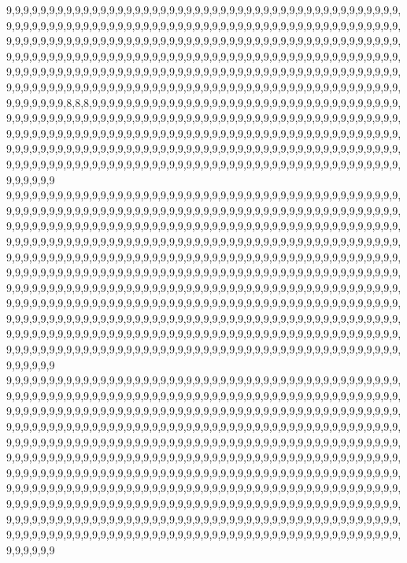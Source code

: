 9,9,9,9,9,9,9,9,9,9,9,9,9,9,9,9,9,9,9,9,9,9,9,9,9,9,9,9,9,9,9,9,9,9,9,9,9,9,9,9,9,9,9,9,9,9,9,9,9,9,9,9,9,9,9,9,9,9,9,9,9,9,9,9,9,9,9,9,9,9,9,9,9,9,9,9,9,9,9,9,9,9,9,9,9,9,9,9,9,9,9,9,9,9,9,9,9,9,9,9,9,9,9,9,9,9,9,9,9,9,9,9,9,9,9,9,9,9,9,9,9,9,9,9,9,9,9,9,9,9,9,9,9,9,9,9,9,9,9,9,9,9,9,9,9,9,9,9,9,9,9,9,9,9,9,9,9,9,9,9,9,9,9,9,9,9,9,9,9,9,9,9,9,9,9,9,9,9,9,9,9,9,9,9,9,9,9,9,9,9,9,9,9,9,9,9,9,9,9,9,9,9,9,9,9,9,9,9,9,9,9,9,9,9,9,9,9,9,9,9,9,9,9,9,9,9,9,9,9,9,9,9,9,9,9,9,9,9,9,9,9,9,9,9,9,9,9,9,9,9,9,9,9,9,9,9,9,9,9,9,9,9,9,9,9,9,9,9,9,9,9,9,9,9,9,9,9,9,9,9,9,9,9,8,8,8,9,9,9,9,9,9,9,9,9,9,9,9,9,9,9,9,9,9,9,9,9,9,9,9,9,9,9,9,9,9,9,9,9,9,9,9,9,9,9,9,9,9,9,9,9,9,9,9,9,9,9,9,9,9,9,9,9,9,9,9,9,9,9,9,9,9,9,9,9,9,9,9,9,9,9,9,9,9,9,9,9,9,9,9,9,9,9,9,9,9,9,9,9,9,9,9,9,9,9,9,9,9,9,9,9,9,9,9,9,9,9,9,9,9,9,9,9,9,9,9,9,9,9,9,9,9,9,9,9,9,9,9,9,9,9,9,9,9,9,9,9,9,9,9,9,9,9,9,9,9,9,9,9,9,9,9,9,9,9,9,9,9,9,9,9,9,9,9,9,9,9,9,9,9,9,9,9,9,9,9,9,9,9,9,9,9,9,9,9,9,9,9,9,9,9,9,9,9,9,9,9,9,9,9,9,9,9,9,9,9,9,9,9,9,9,9,9,9,9,9,9,9,9,9,9,9
9,9,9,9,9,9,9,9,9,9,9,9,9,9,9,9,9,9,9,9,9,9,9,9,9,9,9,9,9,9,9,9,9,9,9,9,9,9,9,9,9,9,9,9,9,9,9,9,9,9,9,9,9,9,9,9,9,9,9,9,9,9,9,9,9,9,9,9,9,9,9,9,9,9,9,9,9,9,9,9,9,9,9,9,9,9,9,9,9,9,9,9,9,9,9,9,9,9,9,9,9,9,9,9,9,9,9,9,9,9,9,9,9,9,9,9,9,9,9,9,9,9,9,9,9,9,9,9,9,9,9,9,9,9,9,9,9,9,9,9,9,9,9,9,9,9,9,9,9,9,9,9,9,9,9,9,9,9,9,9,9,9,9,9,9,9,9,9,9,9,9,9,9,9,9,9,9,9,9,9,9,9,9,9,9,9,9,9,9,9,9,9,9,9,9,9,9,9,9,9,9,9,9,9,9,9,9,9,9,9,9,9,9,9,9,9,9,9,9,9,9,9,9,9,9,9,9,9,9,9,9,9,9,9,9,9,9,9,9,9,9,9,9,9,9,9,9,9,9,9,9,9,9,9,9,9,9,9,9,9,9,9,9,9,9,9,9,9,9,9,9,9,9,9,9,9,9,9,9,9,9,9,9,9,9,9,9,9,9,9,9,9,9,9,9,9,9,9,9,9,9,9,9,9,9,9,9,9,9,9,9,9,9,9,9,9,9,9,9,9,9,9,9,9,9,9,9,9,9,9,9,9,9,9,9,9,9,9,9,9,9,9,9,9,9,9,9,9,9,9,9,9,9,9,9,9,9,9,9,9,9,9,9,9,9,9,9,9,9,9,9,9,9,9,9,9,9,9,9,9,9,9,9,9,9,9,9,9,9,9,9,9,9,9,9,9,9,9,9,9,9,9,9,9,9,9,9,9,9,9,9,9,9,9,9,9,9,9,9,9,9,9,9,9,9,9,9,9,9,9,9,9,9,9,9,9,9,9,9,9,9,9,9,9,9,9,9,9,9,9,9,9,9,9,9,9,9,9,9,9,9,9,9,9,9,9,9,9,9,9,9,9,9,9,9,9,9,9,9,9,9,9,9,9,9,9,9,9,9,9,9,9,9,9,9,9,9,9,9,9,9,9,9,9,9,9,9,9,9,9,9,9
9,9,9,9,9,9,9,9,9,9,9,9,9,9,9,9,9,9,9,9,9,9,9,9,9,9,9,9,9,9,9,9,9,9,9,9,9,9,9,9,9,9,9,9,9,9,9,9,9,9,9,9,9,9,9,9,9,9,9,9,9,9,9,9,9,9,9,9,9,9,9,9,9,9,9,9,9,9,9,9,9,9,9,9,9,9,9,9,9,9,9,9,9,9,9,9,9,9,9,9,9,9,9,9,9,9,9,9,9,9,9,9,9,9,9,9,9,9,9,9,9,9,9,9,9,9,9,9,9,9,9,9,9,9,9,9,9,9,9,9,9,9,9,9,9,9,9,9,9,9,9,9,9,9,9,9,9,9,9,9,9,9,9,9,9,9,9,9,9,9,9,9,9,9,9,9,9,9,9,9,9,9,9,9,9,9,9,9,9,9,9,9,9,9,9,9,9,9,9,9,9,9,9,9,9,9,9,9,9,9,9,9,9,9,9,9,9,9,9,9,9,9,9,9,9,9,9,9,9,9,9,9,9,9,9,9,9,9,9,9,9,9,9,9,9,9,9,9,9,9,9,9,9,9,9,9,9,9,9,9,9,9,9,9,9,9,9,9,9,9,9,9,9,9,9,9,9,9,9,9,9,9,9,9,9,9,9,9,9,9,9,9,9,9,9,9,9,9,9,9,9,9,9,9,9,9,9,9,9,9,9,9,9,9,9,9,9,9,9,9,9,9,9,9,9,9,9,9,9,9,9,9,9,9,9,9,9,9,9,9,9,9,9,9,9,9,9,9,9,9,9,9,9,9,9,9,9,9,9,9,9,9,9,9,9,9,9,9,9,9,9,9,9,9,9,9,9,9,9,9,9,9,9,9,9,9,9,9,9,9,9,9,9,9,9,9,9,9,9,9,9,9,9,9,9,9,9,9,9,9,9,9,9,9,9,9,9,9,9,9,9,9,9,9,9,9,9,9,9,9,9,9,9,9,9,9,9,9,9,9,9,9,9,9,9,9,9,9,9,9,9,9,9,9,9,9,9,9,9,9,9,9,9,9,9,9,9,9,9,9,9,9,9,9,9,9,9,9,9,9,9,9,9,9,9,9,9,9,9,9,9,9,9,9,9,9,9,9,9,9,9,9,9,9,9,9,9,9,9,9,9,9
